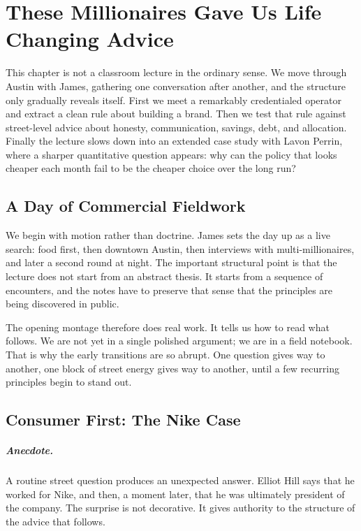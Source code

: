 \chapter{These Millionaires Gave Us Life Changing Advice}

This chapter is not a classroom lecture in the ordinary sense. We move through Austin with James, gathering one conversation after another, and the structure only gradually reveals itself. First we meet a remarkably credentialed operator and extract a clean rule about building a brand. Then we test that rule against street-level advice about honesty, communication, savings, debt, and allocation. Finally the lecture slows down into an extended case study with Lavon Perrin, where a sharper quantitative question appears: why can the policy that looks cheaper each month fail to be the cheaper choice over the long run?

\section{A Day of Commercial Fieldwork}

We begin with motion rather than doctrine. James sets the day up as a live search: food first, then downtown Austin, then interviews with multi-millionaires, and later a second round at night. The important structural point is that the lecture does not start from an abstract thesis. It starts from a sequence of encounters, and the notes have to preserve that sense that the principles are being discovered in public.

The opening montage therefore does real work. It tells us how to read what follows. We are not yet in a single polished argument; we are in a field notebook. That is why the early transitions are so abrupt. One question gives way to another, one block of street energy gives way to another, until a few recurring principles begin to stand out.

\section{Consumer First: The Nike Case}

\paragraph{Anecdote.} A routine street question produces an unexpected answer. Elliot Hill says that he worked for Nike, and then, a moment later, that he was ultimately president of the company. The surprise is not decorative. It gives authority to the structure of the advice that follows.

